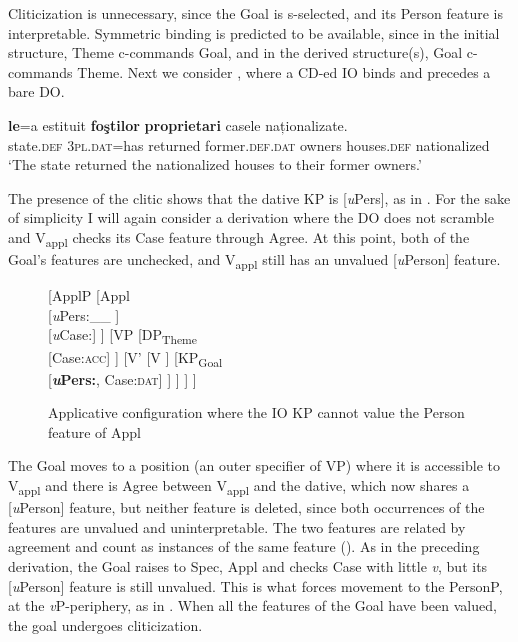 \documentclass[output=paper,colorlinks,citecolor=brown,nonflat]{langsci/langscibook}
\begin{document}
Cliticization is unnecessary, since the Goal is s-selected, and its Person feature is interpretable. Symmetric binding is predicted to be available, since in the initial structure, Theme c-commands Goal, and in the derived structure(s), Goal c-commands Theme. Next we consider , where a CD-ed IO binds and precedes a bare DO.

\ea%
 \label{ex:cornilescu:26}
  \textbf{le}=a {estituit} \textbf{foştilor} \textbf{proprietari} {casele} {naționalizate}.\\
 state.\textsc{def} \textsc{3pl.dat}=has returned former.\textsc{def}.\textsc{dat} owners houses.\textsc{def} nationalized\\
 \glt ‘The state returned the nationalized houses to their former owners.’
 \z

The presence of the clitic shows that the dative KP is [\textit{u}Pers], as in . For the sake of simplicity I will again consider a derivation where the DO does not scramble and V\textsubscript{appl} checks its Case feature through Agree. At this point, both of the Goal’s features are unchecked, and V\textsubscript{appl} still has an unvalued [\textit{u}Person] feature.

\begin{figure}%
	\begin{forest}
		[ApplP
			[Appl\\
				{[}\textit{u}Pers:\_\_ {]}\\
				{[}\textit{u}Case:{\longrule}{]}
			]
			[VP
				[DP\textsubscript{Theme} \\
				 {[}Case:\textsc{acc}{]}
				]
				[V'
					[V
					]
					[KP\textsubscript{Goal}\\{[}\textbf{\textit{u}Pers:{\longrule}}{,} Case:\textsc{dat}{]}
					]
				]
			]
		]
	\end{forest}
	\caption{\label{fig:cornilescu:9} Applicative configuration where the IO KP cannot value the Person feature of Appl}
\end{figure}


The Goal moves to a position (an outer specifier of VP) where it is accessible to V\textsubscript{appl} and there is Agree between V\textsubscript{appl} and the dative, which now shares a [\textit{u}Person] feature, but neither feature is deleted, since both occurrences of the features are unvalued and uninterpretable. The two features are related by agreement and count as instances of the same feature (\citealt{PesetskyTorrego2007}). As in the preceding derivation, the Goal raises to Spec, Appl and checks Case with little \textit{v}, but its [\textit{u}Person] feature is still unvalued. This is what forces movement to the PersonP, at the  \textit{v}P-periphery, as in . When all the features of the Goal have been valued, the goal undergoes cliticization.
\end{document}
